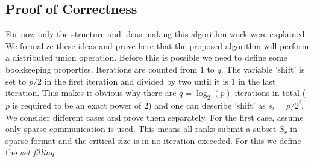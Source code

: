 \subsection{Proof of Correctness}
For now only the structure and ideas making this algorithm work were explained. We formalize these ideas and prove here that the proposed algorithm will perform a distributed union operation. Before this is possible we need to define some bookkeeping properties. Iterations are counted from $1$ to $q$. The variable 'shift' is set to $p/2$ in the first iteration and divided by two until it is $1$ in the last iteration. This makes it obvious why there are $q=\log_2(p)$ iterations in total ($p$ is required to be an exact power of 2) and one can describe 'shift' as $s_i=p/2^i$. \\
We consider different cases and prove them separately. For the first case, assume only sparse communication is used. This means all ranks submit a subset $S_r$ in sparse format and the critical size is in no iteration exceeded. For this we define the \emph{set filling}:
